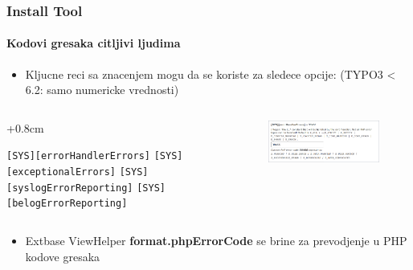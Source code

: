 
\begin{frame}[fragile]
	\frametitle{Install Tool}
	\framesubtitle{Kodovi gresaka citljivi ljudima}

	\begin{itemize}
		\item Kljucne reci sa znacenjem mogu da se koriste za sledece opcije:\newline
			(TYPO3 < 6.2: samo numericke vrednosti)
	\end{itemize}

	\begin{columns}[T]
		\begin{column}{.4\textwidth}
			\advance\leftskip+0.8cm

			\smaller
				\texttt{[SYS][errorHandlerErrors]}\newline
				\texttt{[SYS][exceptionalErrors]}\newline
				\texttt{[SYS][syslogErrorReporting]}\newline
				\texttt{[SYS][belogErrorReporting]}\newline
			\normalsize

		\end{column}
		\begin{column}{.6\textwidth}

			\begin{figure}\vspace*{-0.4cm}
				\includegraphics[width=0.9\linewidth]{Images/InstallTool/HumanFriendlyErrorCodes.png}
			\end{figure}

		\end{column}
	\end{columns}

	\vspace{0.2cm}

	\begin{itemize}
		\item Extbase ViewHelper \textbf{format.phpErrorCode} se brine za prevodjenje u PHP kodove gresaka
	\end{itemize}

\end{frame}

